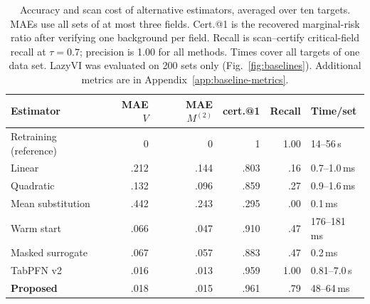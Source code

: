 \begin{table}[!tb]
\centering\small
\caption{Accuracy and scan cost of alternative estimators, averaged over ten targets. MAEs use all sets of at most three fields. Cert.@1 is the recovered marginal-risk ratio after verifying one background per field. Recall is scan--certify critical-field recall at $\tau=0.7$; precision is 1.00 for all methods. Times cover all targets of one data set. LazyVI was evaluated on 200 sets only (Fig.~\ref{fig:baselines}). Additional metrics are in Appendix~\ref{app:baseline-metrics}.}\label{tab:baselines}
\setlength{\tabcolsep}{4pt}
\begin{tabular}{lrrrrl}
\toprule
Estimator & MAE $V$ & MAE $M^{(2)}$ & cert.@1 & Recall & Time/set\\
\midrule
Retraining (reference) & 0 & 0 & 1 & 1.00 & 14--56\,s\\
Linear & .212 & .144 & .803 & .16 & 0.7--1.0\,ms\\
Quadratic & .132 & .096 & .859 & .27 & 0.9--1.6\,ms\\
Mean substitution & .442 & .243 & .295 & .00 & 0.1\,ms\\
Warm start & .066 & .047 & .910 & .47 & 176--181\,ms\\
Masked surrogate & .067 & .057 & .883 & .47 & 0.2\,ms\\
TabPFN v2 & .016 & .013 & .959 & 1.00 & 0.81--7.0\,s\\
\textbf{Proposed} & .018 & .015 & .961 & .79 & 48--64\,ms\\
\bottomrule
\end{tabular}
\end{table}
